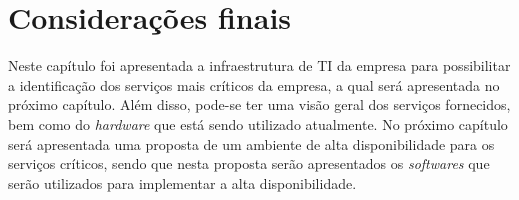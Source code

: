 \section{Considerações finais}

Neste capítulo foi apresentada a infraestrutura de \ac{TI} da empresa para possibilitar a identificação dos serviços mais críticos 
da empresa, a qual será apresentada no próximo capítulo. Além disso, pode-se ter uma visão geral dos serviços fornecidos, bem como do 
\textit{hardware} que está sendo utilizado atualmente. No próximo capítulo será apresentada uma proposta de um ambiente de alta disponibilidade 
para os serviços críticos, sendo que nesta proposta serão apresentados os \textit{softwares} que serão utilizados para implementar a alta 
disponibilidade.
